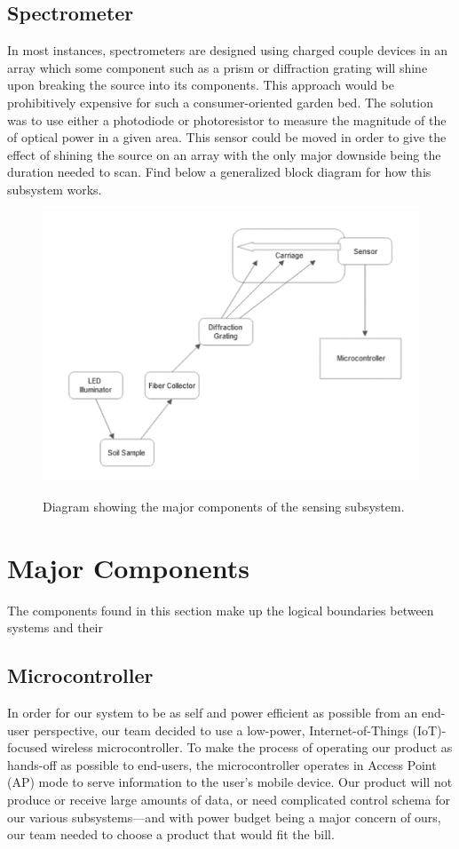\documentclass[journal]{IEEEtran}
\begin{document}
\subsection{Spectrometer} 
In most instances, spectrometers are designed using charged couple devices in an array which some
component such as a prism or diffraction grating will shine upon breaking the source into its
components. This approach would be prohibitively expensive for such a consumer-oriented garden
bed. The solution was to use either a photodiode or photoresistor to measure the magnitude of the
of optical power in a given area\cite{Cao}. This sensor could be moved in order to give the effect of shining
the source on an array with the only major downside being the duration needed to scan. Find below a
generalized block diagram for how this subsystem works.
\begin{figure}[H]
	\centering
	\includegraphics[width=\linewidth]{images/OpticsBlockDiagram.png}
	\label{fig:sensing-block}
	\caption{Diagram showing the major components of the sensing subsystem.}
\end{figure}
\section{Major Components} \label{sec:major-components}
The components found in this section make up the logical boundaries between systems and their
\subsection{Microcontroller}
In order for our system to be as self and power efficient as possible from an end-user perspective, our team decided to use a low-power, Internet-of-Things (IoT)-focused wireless microcontroller. To make the process of operating our product as hands-off as possible to end-users, the microcontroller operates in Access Point (AP) mode to serve information to the user's mobile device. Our product will not produce or receive large amounts of data, or need complicated control schema for our various subsystems---and with power budget being a major concern of ours, our team needed to choose a product that would fit the bill.
\end{document}

